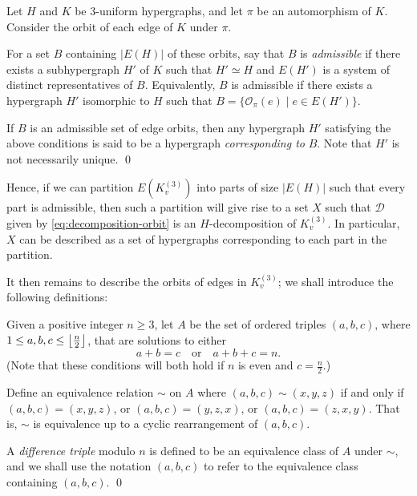 \begin{definition} \label{def:admissible-orbits}
Let $H$ and $K$ be $3$-uniform hypergraphs, and let $\pi$ be an automorphism of $K$.
Consider the orbit of each edge of $K$ under $\pi$.

For a set $B$ containing $|E(H)|$ of these orbits, say that $B$ is {\em admissible} if there exists a subhypergraph $H'$ of $K$ such that $H' \simeq H$ and $E(H')$ is a system of distinct representatives of $B$. Equivalently, $B$ is admissible if there exists a hypergraph $H'$ isomorphic to $H$ such that $B = \{\mathcal{O}_\pi(e) \mid e \in E(H')\}$.

If $B$ is an admissible set of edge orbits, then any hypergraph $H'$ satisfying the above conditions is said to be a hypergraph {\em corresponding to} $B$. Note that $H'$ is not necessarily unique.
\qed
\end{definition}

Hence, if we can partition $E(K_{v}^{(3)})$ into parts of size $|E(H)|$ such that every part is admissible, then such a partition will give rise to a set $X$ such that $\mathcal{D}$ given by \eqref{eq:decomposition-orbit} is an $H$-decomposition of $K_{v}^{(3)}$. In particular, $X$ can be described as a set of hypergraphs corresponding to each part in the partition.

It then remains to describe the orbits of edges in $K_{v}^{(3)}$; we shall introduce the following definitions:

\begin{definition} \label{def:diff-triple}
Given a positive integer $n \geq 3$, let $A$ be the set of ordered triples $(a, b, c)$, where $1 \leq a, b, c \leq \left\lfloor \frac{n}{2} \right\rfloor$, that are solutions to either
\[
    a + b = c \quad \text{or} \quad a + b + c = n.
\]
(Note that these conditions will both hold if $n$ is even and $c = \frac{n}{2}$.)

Define an equivalence relation $\sim$ on $A$ where $(a, b, c) \sim (x, y, z)$ if and only if $(a, b, c) = (x, y, z)$, or $(a, b, c) = (y, z, x)$, or $(a, b, c) = (z, x, y)$. That is, $\sim$ is equivalence up to a cyclic rearrangement of $(a, b, c)$.

A {\em difference triple} modulo $n$ is defined to be an equivalence class of $A$ under $\sim$, and we shall use the notation $(a, b, c)$ to refer to the equivalence class containing $(a, b, c)$.
\qed
\end{definition}

